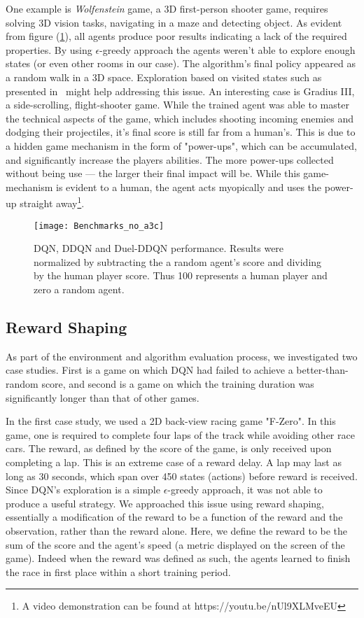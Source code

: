 \documentclass{article}
\begin{document}
One example is \textit{Wolfenstein} game, a 3D first-person shooter game, requires solving 3D vision tasks, navigating in a maze and detecting object.
As evident from figure (\ref{fig:Benchmarks_no_a3c}), all agents produce poor results indicating a lack of the required properties.
By using $\epsilon$-greedy approach the agents weren't able to explore enough states (or even other rooms in our case). The algorithm's final policy appeared as a random walk in a 3D space. 
Exploration based on visited states such as presented in~\citet{bellemare2016unifying} might help addressing this issue.
An interesting case is Gradius III, a side-scrolling, flight-shooter game. While the trained agent was able to master the technical aspects of the game, which includes shooting incoming enemies and dodging their projectiles, it's final score is still far from a human's. This is due to a hidden game mechanism in the form of "power-ups", which can be accumulated, and significantly increase the players abilities. The more power-ups collected without being use --- the larger their final impact will be. While this game-mechanism is evident to a human, the agent acts myopically and uses the power-up straight away\footnote{A video demonstration can be found at https://youtu.be/nUl9XLMveEU}.


\begin{figure}[h]
\texttt{[image: Benchmarks\_no\_a3c]} 
\caption{DQN, DDQN and Duel-DDQN performance. Results were normalized by subtracting the a random agent's score and dividing by the human player score. Thus 100 represents a human player and zero a random agent.}
\label{fig:Benchmarks_no_a3c}
\end{figure}

\subsection{Reward Shaping} \label{reward shaping}
As part of the environment and algorithm evaluation process, we investigated two case studies. First is a game on which DQN had failed to achieve a better-than-random score, and second is a game on which the training duration was significantly longer than that of other games.

In the first case study, we used a 2D back-view racing game "F-Zero". 
In this game, one is required to complete four laps of the track while avoiding other race cars. 
The reward, as defined by the score of the game, is only received upon completing a lap. This is an extreme case of a reward delay. A lap may last as long as 30 seconds, which span over 450 states (actions) before reward is received. 
Since DQN's exploration is a simple $\epsilon$-greedy approach, it was not able to produce a useful strategy. 
We approached this issue using reward shaping, essentially a modification of the reward to be a function of the reward and the observation, rather than the reward alone. 
Here, we define the reward to be the sum of the score and the agent's speed (a metric displayed on the screen of the game). 
Indeed when the reward was defined as such, the agents learned to finish the race in first place within a short training period.
\end{document}

